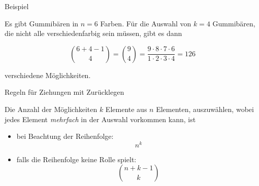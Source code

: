 \documentclass[12pt,ngerman,a4paper,ignorenonframetext,]{beamer}
\providecommand{\tightlist}{%
  \setlength{\itemsep}{0pt}\setlength{\parskip}{0pt}}
\begin{document}
\begin{frame}{Beispiel}
\protect\hypertarget{beispiel-1}{}


\begin{Beispiel}

Es gibt Gummibären in \(n=6\) Farben. Für die Auswahl von \(k=4\)
Gummibären, die nicht alle verschiedenfarbig sein müssen, gibt es dann

\begin{equation*}
    \binom{6+4-1}{4} = \binom{9}{4} = \frac{9\cdot 8\cdot 7 \cdot 6}{1 \cdot 2 \cdot 3 \cdot 4} = 126
\end{equation*}

verschiedene Möglichkeiten.

\end{Beispiel}

\end{frame}

\begin{frame}{Regeln für Ziehungen mit Zurücklegen}
\protect\hypertarget{regeln-fur-ziehungen-mit-zurucklegen}{}


\begin{Satz}

Die Anzahl der Möglichkeiten \(k\) Elemente aus \(n\) Elementen,
auszuwählen, wobei jedes Element \textit{mehrfach} in der Auswahl
vorkommen kann, ist

\begin{itemize}
\tightlist
\item
  bei Beachtung der Reihenfolge: \begin{equation*} 
        n^k 
    \end{equation*}
\item
  falls die Reihenfolge keine Rolle spielt: \begin{equation*} 
        \binom{n+k-1}{k} 
    \end{equation*}
\end{itemize}

\end{Satz}

\end{frame}
\end{document}
